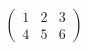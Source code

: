 \documentclass{article}
\begin{document}
\[
\begin{pmatrix}
1 & 2 & 3 \\
4 & 5 & 6
\end{pmatrix}
\]
\end{document}
